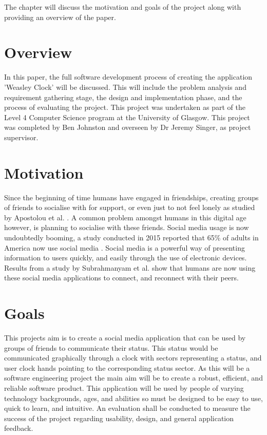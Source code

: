 The chapter will discuss the motivation and goals of the project along with providing an overview of the paper.

\section{Overview}

In this paper, the full software development process of creating the application 'Weasley Clock' will be discussed. This will include the problem analysis and requirement gathering stage, the design and implementation phase, and the process of evaluating the project. This project was undertaken as part of the Level 4 Computer Science program at the University of Glasgow. This project was completed by Ben Johnston and overseen by Dr Jeremy Singer, as project supervisor.

\section{Motivation}
Since the beginning of time humans have engaged in friendships, creating groups of friends to socialise with for support, or even just to not feel lonely as studied by Apostolou et al. \cite{whyFriends}. A common problem amongst humans in this digital age however, is planning to socialise with these friends. \newline\newline
Social media usage is now undoubtedly booming, a study conducted in 2015 reported that 65\% of adults in America now use social media \cite{socialMediaUsage}. Social media is a powerful way of presenting information to users quickly, and easily through the use of electronic devices. Results from a study by Subrahmanyam et al. \cite{SUBRAHMANYAM2008420} show that humans are now using these social media applications to connect, and reconnect with their peers.


\section{Goals}
This projects aim is to create a social media application that can be used by groups of friends to communicate their status. This status would be communicated graphically through a clock with sectors representing a status, and user clock hands pointing to the corresponding status sector. As this will be a software engineering project the main aim will be to create a robust, efficient, and reliable software product. This application will be used by people of varying technology backgrounds, ages, and abilities so must be designed to be easy to use, quick to learn, and intuitive. An evaluation shall be conducted to measure the success of the project regarding usability, design, and general application feedback.


